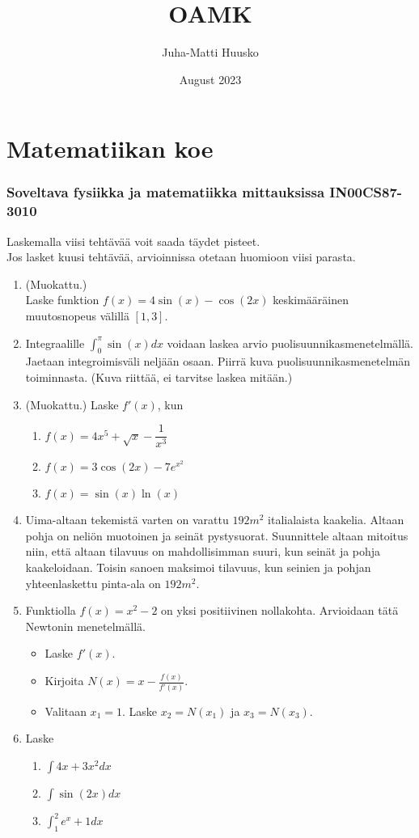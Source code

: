 \documentclass[12pt]{article}
\title{OAMK}
\author{Juha-Matti Huusko}
\date{August 2023}
\begin{document}
\thispagestyle{empty}

\section*{Matematiikan koe}
\subsubsection*{Soveltava fysiikka ja matematiikka mittauksissa IN00CS87-3010}

Laskemalla viisi tehtävää voit saada täydet pisteet.\\ Jos lasket kuusi tehtävää, arvioinnissa otetaan huomioon viisi parasta.

\begin{enumerate}
\item (Muokattu.)\\ Laske funktion $f(x)=4\sin(x)-\cos(2x)$ keskimääräinen muutosnopeus välillä $[1,3]$.
\item Integraalille $\int_0^\pi \sin(x)dx$ voidaan laskea arvio puolisuunnikasmenetelmällä. Jaetaan integroimisväli neljään osaan. Piirrä kuva puolisuunnikasmenetelmän toiminnasta. (Kuva riittää, ei tarvitse laskea mitään.)
\item (Muokattu.) Laske $f'(x)$, kun
\begin{enumerate}
\item $f(x)=4x^5+\sqrt{x}-\dfrac{1}{x^3}$
\item $f(x)=3\cos(2x)-7e^{x^2}$
\item $f(x)=\sin(x)\ln(x)$
\end{enumerate}
\item Uima-altaan tekemistä varten on varattu $192 m^2$ italialaista kaakelia. Altaan pohja on neliön muotoinen ja seinät pystysuorat. Suunnittele altaan mitoitus niin, että altaan tilavuus on mahdollisimman suuri, kun seinät ja pohja kaakeloidaan. Toisin sanoen maksimoi tilavuus, kun seinien ja pohjan yhteenlaskettu pinta-ala on $192m^2$.
 \item Funktiolla $f(x)=x^2-2$ on yksi positiivinen nollakohta. Arvioidaan tätä Newtonin menetelmällä.
\begin{itemize}
\item Laske $f'(x)$.
\item Kirjoita $N(x)=x-\frac{f(x)}{f'(x)}$.
\item Valitaan $x_1=1$. Laske $x_2=N(x_1)$ ja $x_3=N(x_3)$.
\end{itemize}
\item Laske
\begin{enumerate}
\item $\int 4x+3x^2dx$
\item $\int \sin(2x)dx$
\item $\int_1^2 e^{x}+1dx$
\end{enumerate}
\end{enumerate}
\end{document}
